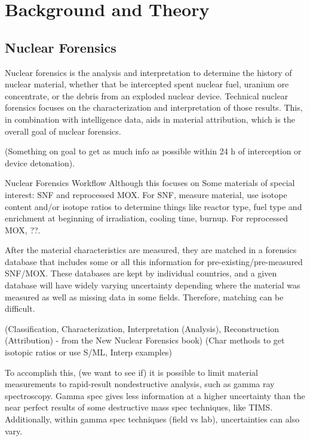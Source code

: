 \documentclass{anstrans}
\begin{document}
\section{Background and Theory}

\subsection{Nuclear Forensics}

Nuclear forensics is the analysis and interpretation to determine the history
of nuclear material, whether that be intercepted spent nuclear fuel, uranium
ore concentrate, or the debris from an exploded nuclear device. Technical
nuclear forensics focuses on the characterization and interpretation of those
results. This, in combination with intelligence data, aids in material
attribution, which is the overall goal of nuclear forensics.  

(Something on goal to get as much info as possible within 24 h of interception
or device detonation). 

Nuclear Forensics Workflow Although this focuses on Some materials of special
interest: SNF and reprocessed MOX.  For SNF, measure material, use isotope
content and/or isotope ratios to determine things like reactor type, fuel type
and enrichment at beginning of irradiation, cooling time, burnup. For
reprocessed MOX, ??. 

After the material characteristics are measured, they are matched in a
forensics database that includes some or all this information for
pre-existing/pre-measured SNF/MOX. These databases are kept by individual
countries, and a given database will have widely varying uncertainty depending
where the material was measured as well as missing data in some fields.
Therefore, matching can be difficult.

(Classification, Characterization, Interpretation (Analysis), Reconstruction
(Attribution) - from the New Nuclear Forensics book) (Char methods to get
isotopic ratios or use S/ML, Interp examples)

To accomplish this, (we want to see if) it is possible to limit material
measurements to rapid-result nondestructive analysis, such as gamma ray
spectroscopy. Gamma spec gives less information at a higher uncertainty than
the near perfect results of some destructive mass spec techniques, like TIMS.
Additionally, within gamma spec techniques (field vs lab), uncertainties can
also vary.
\end{document}
